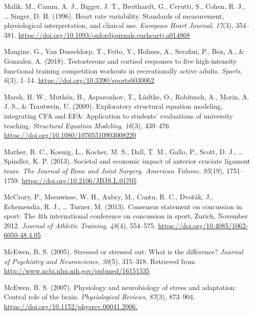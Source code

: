 \documentclass[
  english,
  man,floatsintext]{apa6}
\begin{document}
\leavevmode\hypertarget{ref-Malik1996}{}%
Malik, M., Camm, A. J., Bigger, J. T., Breithardt, G., Cerutti, S., Cohen, R. J., \ldots{} Singer, D. H. (1996). Heart rate variability. Standards of measurement, physiological interpretation, and clinical use. \emph{European Heart Journal}, \emph{17}(3), 354--381. \url{https://doi.org/10.1093/oxfordjournals.eurheartj.a014868}

\leavevmode\hypertarget{ref-Mangine2018}{}%
Mangine, G., Van Dusseldorp, T., Feito, Y., Holmes, A., Serafini, P., Box, A., \& Gonzalez, A. (2018). Testosterone and cortisol responses to five high-intensity functional training competition workouts in recreationally active adults. \emph{Sports}, \emph{6}(3), 1--14. \url{https://doi.org/10.3390/sports6030062}

\leavevmode\hypertarget{ref-Marsh2009}{}%
Marsh, H. W., Muthén, B., Asparouhov, T., Lüdtke, O., Robitzsch, A., Morin, A. J. S., \& Trautwein, U. (2009). Exploratory structural equation modeling, integrating CFA and EFA: Application to students' evaluations of university teaching. \emph{Structural Equation Modeling}, \emph{16}(3), 439--476. \url{https://doi.org/10.1080/10705510903008220}

\leavevmode\hypertarget{ref-Mather2013}{}%
Mather, R. C., Koenig, L., Kocher, M. S., Dall, T. M., Gallo, P., Scott, D. J., \ldots{} Spindler, K. P. (2013). Societal and economic impact of anterior cruciate ligament tears. \emph{The Journal of Bone and Joint Surgery. American Volume}, \emph{95}(19), 1751--1759. \url{https://doi.org/10.2106/JBJS.L.01705}

\leavevmode\hypertarget{ref-McCrory2013}{}%
McCrory, P., Meeuwisse, W. H., Aubry, M., Cantu, R. C., Dvořák, J., Echemendia, R. J., \ldots{} Turner, M. (2013). Consensus statement on concussion in sport: The 4th international conference on concussion in sport, Zurich, November 2012. \emph{Journal of Athletic Training}, \emph{48}(4), 554--575. \url{https://doi.org/10.4085/1062-6050-48.4.05}

\leavevmode\hypertarget{ref-McEwen2005}{}%
McEwen, B. S. (2005). Stressed or stressed out: What is the difference? \emph{Journal of Psychiatry and Neuroscience}, \emph{30}(5), 315--318. Retrieved from \url{http://www.ncbi.nlm.nih.gov/pubmed/16151535}

\leavevmode\hypertarget{ref-McEwen2007}{}%
McEwen, B. S. (2007). Physiology and neurobiology of stress and adaptation: Central role of the brain. \emph{Physiological Reviews}, \emph{87}(3), 873--904. \url{https://doi.org/10.1152/physrev.00041.2006.}
\end{document}
